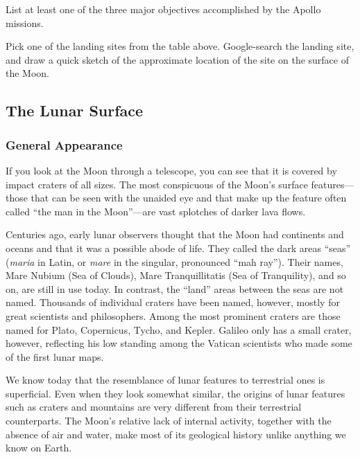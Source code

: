 \documentclass{article}
\numberwithin{equation}{section}
\numberwithin{figure}{section}
\begin{document}
\begin{exercise}
    List at least one of the three major objectives accomplished by the Apollo missions.
\end{exercise}

\begin{exercise}
    Pick one of the landing sites from the table above. Google-search the landing site, and draw a quick sketch of the approximate location of the site on the surface of the Moon.
\end{exercise}

\clearpage

\subsection{The Lunar Surface} \label{6VsXZc}
\subsubsection*{General Appearance}

If you look at the Moon through a telescope, you can see that it is covered by impact craters of all sizes. The most conspicuous of the Moon's surface features---those that can be seen with the unaided eye and that make up the feature often called ``the man in the Moon''---are vast splotches of darker lava flows.

\vspace{1em}

Centuries ago, early lunar observers thought that the Moon had continents and oceans and that it was a possible abode of life. They called the dark areas ``seas'' (\textit{maria} in Latin, or \textit{mare} in the singular, pronounced ``mah ray''). Their names, Mare Nubium (Sea of Clouds), Mare Tranquillitatis (Sea of Tranquility), and so on, are still in use today. In contrast, the ``land'' areas between the seas are not named. Thousands of individual craters have been named, however, mostly for great scientists and philosophers. Among the most prominent craters are those named for Plato, Copernicus, Tycho, and Kepler. Galileo only has a small crater, however, reflecting his low standing among the Vatican scientists who made some of the first lunar maps.

\vspace{1em}

We know today that the resemblance of lunar features to terrestrial ones is superficial. Even when they look somewhat similar, the origins of lunar features such as craters and mountains are very different from their terrestrial counterparts. The Moon's relative lack of internal activity, together with the absence of air and water, make most of its geological history unlike anything we know on Earth.
\end{document}

